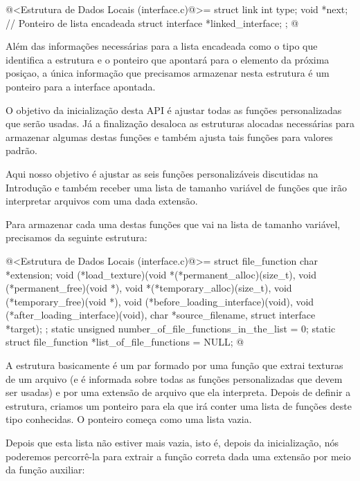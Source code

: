 \iniciocodigo
@<Estrutura de Dados Locais (interface.c)@>=
struct link {
  int type;
  void *next; // Ponteiro de lista encadeada
  struct interface *linked_interface;
};
@
\fimcodigo

Além das informações necessárias para a lista encadeada como o tipo
que identifica a estrutura e o ponteiro que apontará para o elemento
da próxima posiçao, a única informação que precisamos armazenar nesta
estrutura é um ponteiro para a interface apontada.


O objetivo da inicialização desta API é ajustar todas as funções
personalizadas que serão usadas. Já a finalização desaloca as
estruturas alocadas necessárias para armazenar algumas destas funções
e também ajusta tais funções para valores padrão.


Aqui nosso objetivo é ajustar as seis funções personalizáveis
discutidas na Introdução e também receber uma lista de tamanho
variável de funções que irão interpretar arquivos com uma dada
extensão.

Para armazenar cada uma destas funções que vai na lista de tamanho
variável, precisamos da seguinte estrutura:

\iniciocodigo
@<Estrutura de Dados Locais (interface.c)@>=
struct file_function {
  char *extension;
  void (*load_texture)(void *(*permanent_alloc)(size_t),
                      void (*permanent_free)(void *),
                      void *(*temporary_alloc)(size_t),
                      void (*temporary_free)(void *),
                      void (*before_loading_interface)(void),
                      void (*after_loading_interface)(void),
                      char *source_filename, struct interface *target);
};
static unsigned number_of_file_functions_in_the_list = 0;
static struct file_function *list_of_file_functions = NULL;
@
\fimcodigo

A estrutura basicamente é um par formado por uma função que extrai
texturas de um arquivo (e é informada sobre todas as funções
personalizadas que devem ser usadas) e por uma extensão de arquivo que
ela interpreta. Depois de definir a estrutura, criamos um ponteiro
para ela que irá conter uma lista de funções deste tipo conhecidas. O
ponteiro começa como uma lista vazia.

Depois que esta lista não estiver mais vazia, isto é, depois da
inicialização, nós poderemos percorrê-la para extrair a função correta
dada uma extensão por meio da função auxiliar:

